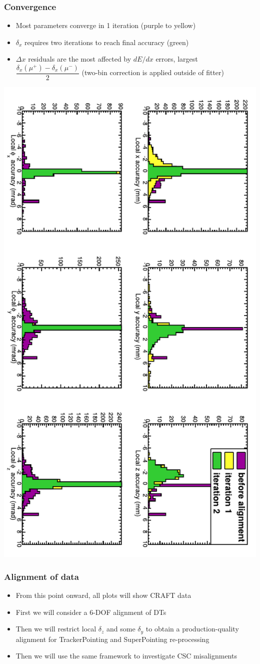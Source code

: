 \documentclass[compress]{beamer}
\begin{document}
\begin{frame}
\frametitle{Convergence}

\begin{itemize}
\item Most parameters converge in 1 iteration (purple to yellow)
\item $\delta_x$ requires two iterations to reach final accuracy (green)
\item $\Delta x$ residuals are the most affected by $dE/dx$ errors,
  largest $\dfrac{\delta_x(\mu^+) - \delta_x(\mu^-)}{2}$ (two-bin correction is applied outside of fitter)
\end{itemize}

\includegraphics[height=\linewidth, angle=90]{mc_convergence.pdf}
\end{frame}

\begin{frame}
\frametitle{Alignment of data}

\begin{itemize}\setlength{\itemsep}{0.2 cm}
\item From this point onward, all plots will show CRAFT data
\item First we will consider a 6-DOF alignment of DTs
\item Then we will restrict local $\delta_z$ and some $\delta_y$ to
  obtain a production-quality alignment for TrackerPointing and SuperPointing re-processing
\item Then we will use the same framework to investigate CSC misalignments
\end{itemize}
\end{frame}
\end{document}
